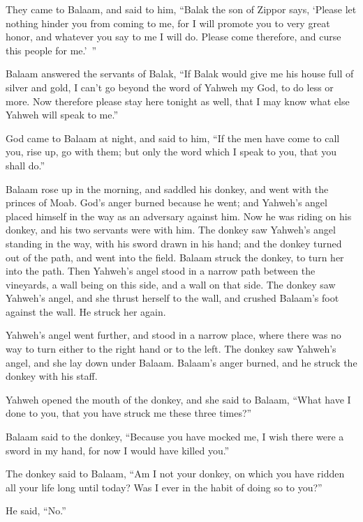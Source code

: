 {They came to Balaam, and said to him, “Balak the son of Zippor says, ‘Please let nothing hinder you from coming to me,
for I will promote you to very great honor, and whatever you say to me I will do. Please come therefore, and curse this people for me.’ ”
\par }{\PP {}Balaam answered the servants of Balak, “If Balak would give me his house full of silver and gold, I can’t go beyond the word of Yahweh my God, to do less or more.
Now therefore please stay here tonight as well, that I may know what else Yahweh will speak to me.”
\par }{\PP {}God came to Balaam at night, and said to him, “If the men have come to call you, rise up, go with them; but only the word which I speak to you, that you shall do.”
\par }{\PP {}Balaam rose up in the morning, and saddled his donkey, and went with the princes of Moab.
God’s anger burned because he went; and Yahweh’s angel placed himself in the way as an adversary against him. Now he was riding on his donkey, and his two servants were with him.
The donkey saw Yahweh’s angel standing in the way, with his sword drawn in his hand; and the donkey turned out of the path, and went into the field. Balaam struck the donkey, to turn her into the path.
Then Yahweh’s angel stood in a narrow path between the vineyards, a wall being on this side, and a wall on that side.
The donkey saw Yahweh’s angel, and she thrust herself to the wall, and crushed Balaam’s foot against the wall. He struck her again.
\par }{\PP {}Yahweh’s angel went further, and stood in a narrow place, where there was no way to turn either to the right hand or to the left.
The donkey saw Yahweh’s angel, and she lay down under Balaam. Balaam’s anger burned, and he struck the donkey with his staff.
\par }{\PP {}Yahweh opened the mouth of the donkey, and she said to Balaam, “What have I done to you, that you have struck me these three times?”
\par }{\PP {}Balaam said to the donkey, “Because you have mocked me, I wish there were a sword in my hand, for now I would have killed you.”
\par }{\PP {}The donkey said to Balaam, “Am I not your donkey, on which you have ridden all your life long until today? Was I ever in the habit of doing so to you?”
\par }{\PP He said, “No.”
}

